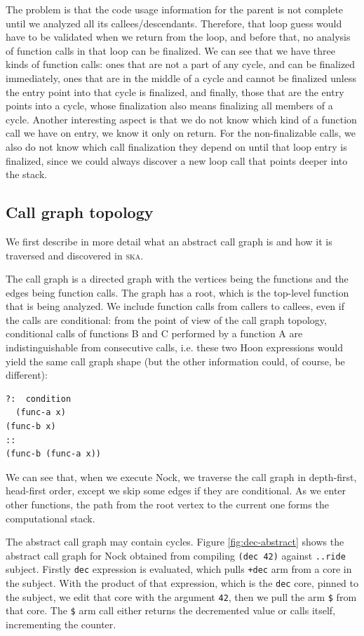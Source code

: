 \documentclass[twoside]{article}
\begin{document}
The problem is that the code usage information for the parent is not complete until we analyzed all its callees/descendants.  Therefore, that loop guess would have to be validated when we return from the loop, and before that, no analysis of function calls in that loop can be finalized.  We can see that we have three kinds of function calls: ones that are not a part of any cycle, and can be finalized immediately, ones that are in the middle of a cycle and cannot be finalized unless the entry point into that cycle is finalized, and finally, those that are the entry points into a cycle, whose finalization also means finalizing all members of a cycle.  Another interesting aspect is that we do not know which kind of a function call we have on entry, we know it only on return. For the non-finalizable calls, we also do not know which call finalization they depend on until that loop entry is finalized, since we could always discover a new loop call that points deeper into the stack.

\subsection{Call graph topology}

We first describe in more detail what an abstract call graph is and how it is traversed and discovered in \textsc{ska}.

The call graph is a directed graph with the vertices being the functions and the edges being function calls.  The graph has a root, which is the top-level function that is being analyzed.  We include function calls from callers to callees, even if the calls are conditional: from the point of view of the call graph topology, conditional calls of functions B and C performed by a function A are indistinguishable from consecutive calls, i.e. these two Hoon expressions would yield the same call graph shape (but the other information could, of course, be different):

\begin{lstlisting}[style=listingblock]
?:  condition
  (func-a x)
(func-b x)
::
(func-b (func-a x))
\end{lstlisting}

We can see that, when we execute Nock, we traverse the call graph in depth-first, head-first order, except we skip some edges if they are conditional.  As we enter other functions, the path from the root vertex to the current one forms the computational stack.

The abstract call graph may contain cycles.  Figure \ref{fig:dec-abstract} shows the abstract call graph for Nock obtained from compiling \lstinline[style=inlinecode]{(dec 42)} against \lstinline[style=inlinecode]{..ride} subject. Firstly \lstinline[style=inlinecode]{dec} expression is evaluated, which pulls \lstinline[style=inlinecode]{+dec} arm from a core in the subject.  With the product of that expression, which is the \lstinline[style=inlinecode]{dec} core, pinned to the subject, we edit that core with the argument \lstinline[style=inlinecode]{42}, then we pull the arm \lstinline[style=inlinecode]{$} from that core.  The \lstinline[style=inlinecode]{$} arm call either returns the decremented value or calls itself, incrementing the counter.
\end{document}
